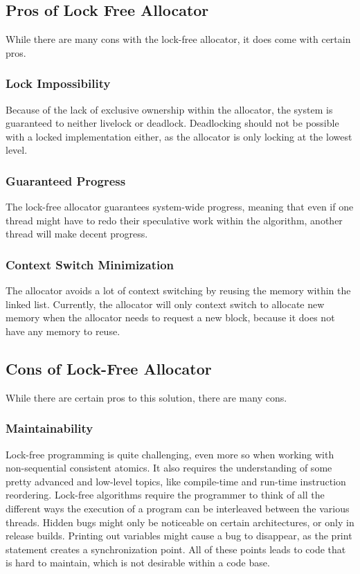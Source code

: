 \subsection{Pros of Lock Free Allocator}
While there are many cons with the lock-free allocator, it does come with certain pros.

\subsubsection{Lock Impossibility}
Because of the lack of exclusive ownership within the allocator, the system is guaranteed to neither livelock or deadlock.
Deadlocking should not be possible with a locked implementation either, as the allocator is only locking at the lowest level.

\subsubsection{Guaranteed Progress}
The lock-free allocator guarantees system-wide progress, meaning that even if one thread might have to redo their speculative work within the algorithm, another thread will make decent progress.

\subsubsection{Context Switch Minimization}
The allocator avoids a lot of context switching by reusing the memory within the linked list.
Currently, the allocator will only context switch to allocate new memory when the allocator needs to request a new block,
because it does not have any memory to reuse.

\subsection{Cons of Lock-Free Allocator}
While there are certain pros to this solution, there are many cons.

\subsubsection{Maintainability}
Lock-free programming is quite challenging, even more so when working with non-sequential consistent atomics.
It also requires the understanding of some pretty advanced and low-level topics, like compile-time and run-time instruction reordering.
Lock-free algorithms require the programmer to think of all the different ways the execution of a program can be interleaved between the various threads.
Hidden bugs might only be noticeable on certain architectures, or only in release builds.
Printing out variables might cause a bug to disappear, as the print statement creates a synchronization point.
All of these points leads to code that is hard to maintain, which is not desirable within a code base.

